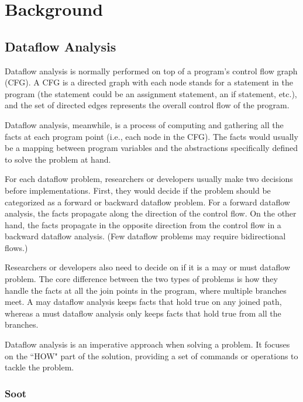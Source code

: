 \chapter{Background}
\label{chap:background}

\section{Dataflow Analysis}

Dataflow analysis is normally performed on top of a program's control flow graph (CFG). A CFG is a directed graph with each node stands for a statement in the program (the statement could be an assignment statement, an if statement, etc.), and the set of directed edges represents the overall control flow of the program.

Dataflow analysis, meanwhile, is a process of computing and gathering all the facts at each program point (i.e., each node in the CFG). The facts would usually be a mapping between program variables and the abstractions specifically defined to solve the problem at hand. 

For each dataflow problem, researchers or developers usually make two decisions before implementations. First, they would decide if the problem should be categorized as a forward or backward dataflow problem. For a forward dataflow analysis, the facts propagate along the direction of the control flow. On the other hand, the facts propagate in the opposite direction from the control flow in a backward dataflow analysis. (Few dataflow problems may require bidirectional flows.)

Researchers or developers also need to decide on if it is a may or must dataflow problem. The core difference between the two types of problems is how they handle the facts at all the join points in the program, where multiple branches meet. A may dataflow analysis keeps facts that hold true on any joined path, whereas a must dataflow analysis only keeps facts that hold true from all the branches.

Dataflow analysis is an imperative approach when solving a problem. It focuses on the ``HOW" part of the solution, providing a set of commands or operations to tackle the problem.

\subsection{Soot}

